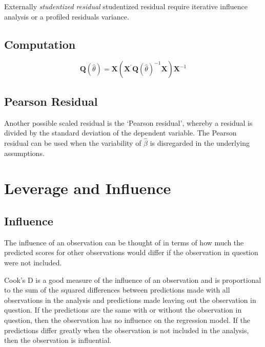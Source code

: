 \documentclass[12pt, a4paper]{article}
\theoremstyle{plain}
\theoremstyle{definition}
\theoremstyle{remark}
\begin{document}
Externally \emph{studentized residual} studentized residual require iterative influence analysis or a profiled residuals variance.

\subsection{Computation}%


\[ \boldsymbol{Q} (\hat{\theta}) = \boldsymbol{X} ( \boldsymbol{X}^{\prime}\boldsymbol{Q} (\hat{\theta})^{-1}\boldsymbol{X})\boldsymbol{X}^{-1} \]

\subsection{Pearson Residual}%

Another possible scaled residual is the  `Pearson residual', whereby a residual is divided by the standard deviation of the dependent variable. The Pearson residual can be used when the variability of $\hat{\beta}$ is disregarded in the underlying assumptions.


\newpage
\section{Leverage and Influence}
\subsection{Influence}
The influence of an observation can be thought of in terms of how much the predicted scores for other observations would differ if the observation in question were not included. 

Cook's D is a good measure of the influence of an observation and is proportional to the sum of the squared differences between predictions made with all observations in the analysis and predictions made leaving out the observation in question. If the predictions are the same with or without the observation in question, then the observation has no influence on the regression model. If the predictions differ greatly when the observation is not included in the analysis, then the observation is influential.
\end{document}
